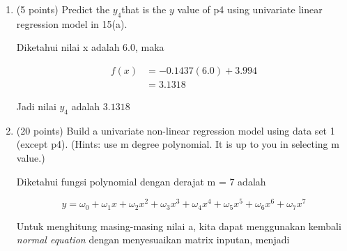 \documentclass[12pt]{article}%
\begin{document}
\begin{enumerate}
\begin{enumerate}
		\item (5 points) Predict the $y_4 $that is the $y$ value of p4 using univariate linear regression model in 15(a).

		\par Diketahui nilai x adalah 6.0, maka

			\begin{align*}
				f(x) & = -0.1437(6.0) + 3.994 \\
				& = 3.1318
			\end{align*}

		\par Jadi nilai $y_4$ adalah $3.1318$

		\item (20 points) Build a univariate non-linear regression model using data set 1 (except p4). (Hints: use m degree polynomial. It is up to you in selecting m value.)

		\par Diketahui fungsi polynomial dengan derajat m = 7 adalah 

			\[y = \omega_0 + \omega_1x + \omega_2x^2 + \omega_3x^3 + \omega_4x^4 + \omega_5x^5 + \omega_6x^6 + \omega_7x^7\]


		\par Untuk menghitung masing-masing nilai a, kita dapat menggunakan kembali \textit{normal equation} dengan menyesuaikan matrix inputan, menjadi


\end{enumerate}
\end{enumerate}
\end{document}
